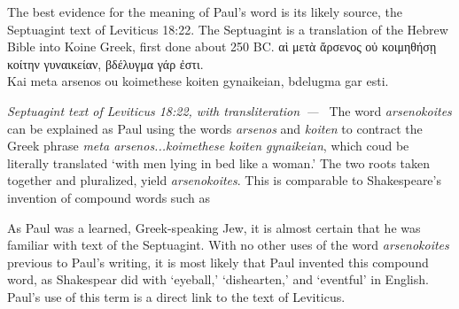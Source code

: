 \documentclass[10pt]{article}
\let\oldquote\quote
\let\endoldquote\endquote
\renewenvironment{quote}[2][]
  {\if\relax\detokenize{#1}\relax
     \def\quoteauthor{#2}%
   \else
     \def\quoteauthor{#2~---~#1}%
   \fi
   \oldquote}
  {\par\nobreak\smallskip\hfill\textit{\quoteauthor}%
   \endoldquote\addvspace{\bigskipamount}}
\begin{document}
The best evidence for the meaning of Paul's word is its likely source, the Septuagint text of Leviticus 18:22. The Septuagint is a translation of the Hebrew Bible into Koine Greek, first done about 250 BC.
\begin{quote}{Septuagint text of Leviticus 18:22, with transliteration}
{\textgreekfont \textKappa αὶ μετὰ ἄρσενος οὐ κοιμηθήσῃ κοίτην γυναικείαν, βδέλυγμα γάρ ἐστι.}\\Kai meta arsenos ou koimethese koiten gynaikeian, bdelugma gar esti.
\end{quote}
The word \textit{arsenokoites} can be explained as Paul using the words \textit{arsenos}  and \textit{koiten} to contract the Greek phrase \textit{meta arsenos...koimethese koiten gynaikeian}, which coud be literally translated `with men lying in bed like a woman.' The two roots taken together and pluralized, yield \textit{arsenokoites}. This is comparable to Shakespeare's invention of compound words such as 

As Paul was a learned, Greek-speaking Jew, it is almost certain that he was familiar with text of the Septuagint. With no other uses of the word \textit{arsenokoites} previous to Paul's writing, it is most likely that Paul invented this compound word, as Shakespear did with `eyeball,' `dishearten,' and `eventful' in English. Paul's use of this term is a direct link to the text of Leviticus. 
\end{document}
